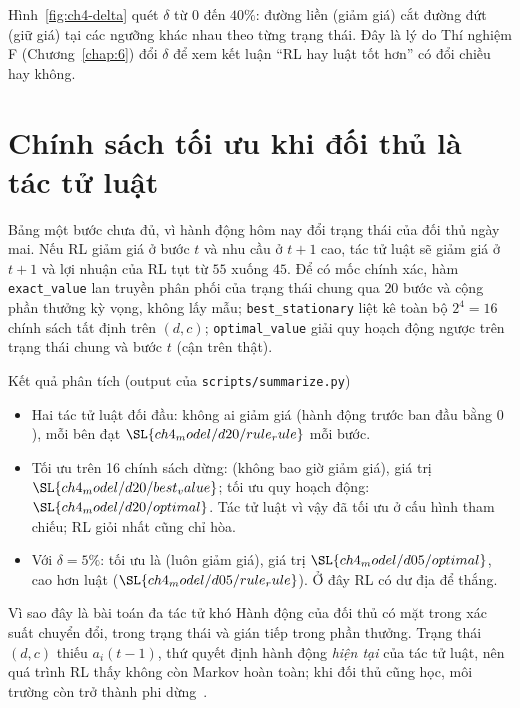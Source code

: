 
Hình~\ref{fig:ch4-delta} quét $\delta$ từ $0$ đến $40\%$: đường liền (giảm giá) cắt đường đứt (giữ giá) tại các ngưỡng
khác nhau theo từng trạng thái. Đây là lý do Thí nghiệm F (Chương~\ref{chap:6}) đổi $\delta$ để xem kết luận ``RL hay luật
tốt hơn'' có đổi chiều hay không.


\section{Chính sách tối ưu khi đối thủ là tác tử luật}\label{sec:best}

Bảng một bước chưa đủ, vì hành động hôm nay đổi trạng thái của đối thủ ngày mai. Nếu RL giảm giá ở bước $t$ và
nhu cầu ở $t+1$ cao, tác tử luật sẽ giảm giá ở $t+1$ và lợi nhuận của RL tụt từ $55$ xuống $45$. Để có mốc chính xác,
hàm \texttt{exact\_value} lan truyền phân phối của trạng thái chung qua $20$ bước và cộng phần thưởng kỳ vọng, không
lấy mẫu; \texttt{best\_stationary} liệt kê toàn bộ $2^4=16$ chính sách tất định trên $(d,c)$; \texttt{optimal\_value}
giải quy hoạch động ngược trên trạng thái chung và bước $t$ (cận trên thật).

\begin{phathien}{Kết quả phân tích (output của \texttt{scripts/summarize.py})}
\begin{itemize}
  \item Hai tác tử luật đối đầu: không ai giảm giá (hành động trước ban đầu bằng $0$), mỗi bên đạt
    $\SL{ch4_model/d20/rule_rule}$ mỗi bước.
  \item Tối ưu trên 16 chính sách dừng: \texttt{} (không bao giờ giảm giá), giá trị
    $\SL{ch4_model/d20/best_value}$; tối ưu quy hoạch động: $\SL{ch4_model/d20/optimal}$. Tác tử luật vì vậy đã tối
    ưu ở cấu hình tham chiếu; RL giỏi nhất cũng chỉ hòa.
  \item Với $\delta=5\%$: tối ưu là \texttt{} (luôn giảm giá), giá trị
    $\SL{ch4_model/d05/optimal}$, cao hơn luật ($\SL{ch4_model/d05/rule_rule}$). Ở đây RL có dư địa để thắng.
\end{itemize}
\end{phathien}

\begin{luuy}{Vì sao đây là bài toán đa tác tử khó}
Hành động của đối thủ có mặt trong xác suất chuyển đổi, trong trạng thái và gián tiếp trong phần thưởng. Trạng thái
$(d,c)$ thiếu $a_i(t-1)$, thứ quyết định hành động \emph{hiện tại} của tác tử luật, nên quá trình RL thấy không còn
Markov hoàn toàn; khi đối thủ cũng học, môi trường còn trở thành phi dừng~\cite{busoniu2008}.
\end{luuy}
